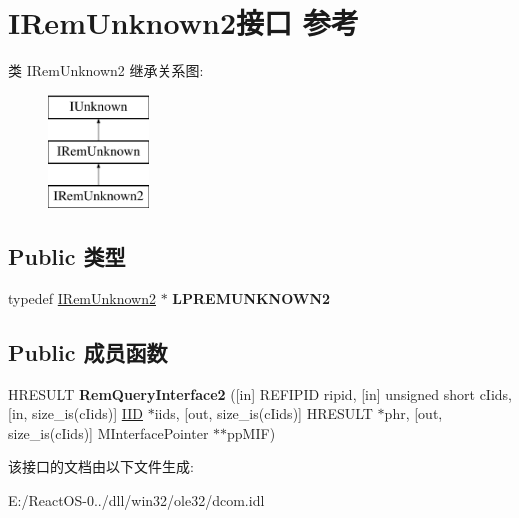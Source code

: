 \hypertarget{interface_i_rem_unknown2}{}\section{I\+Rem\+Unknown2接口 参考}
\label{interface_i_rem_unknown2}
类 I\+Rem\+Unknown2 继承关系图\+:\begin{figure}[H]
\begin{center}
\leavevmode
\includegraphics[height=3.000000cm]{interface_i_rem_unknown2}
\end{center}
\end{figure}
\subsection*{Public 类型}
\begin{DoxyCompactItemize}
\item 
\mbox{\label{interface_i_rem_unknown2_a4846e2af041b3487a0b2133e16fdc4ee}} 
typedef \hyperlink{interface_i_rem_unknown2}{I\+Rem\+Unknown2} $\ast$ {\bfseries L\+P\+R\+E\+M\+U\+N\+K\+N\+O\+W\+N2}
\end{DoxyCompactItemize}
\subsection*{Public 成员函数}
\begin{DoxyCompactItemize}
\item 
\mbox{\label{interface_i_rem_unknown2_ac1080fb722f485a9fb3fbe54d7afbfe9}} 
H\+R\+E\+S\+U\+LT {\bfseries Rem\+Query\+Interface2} (\mbox{[}in\mbox{]} R\+E\+F\+I\+P\+ID ripid, \mbox{[}in\mbox{]} unsigned short c\+Iids, \mbox{[}in, size\+\_\+is(c\+Iids)\mbox{]} \hyperlink{struct___i_i_d}{I\+ID} $\ast$iids, \mbox{[}out, size\+\_\+is(c\+Iids)\mbox{]} H\+R\+E\+S\+U\+LT $\ast$phr, \mbox{[}out, size\+\_\+is(c\+Iids)\mbox{]} M\+Interface\+Pointer $\ast$$\ast$pp\+M\+IF)
\end{DoxyCompactItemize}


该接口的文档由以下文件生成\+:\begin{DoxyCompactItemize}
\item 
E\+:/\+React\+O\+S-\/0../dll/win32/ole32/dcom.\+idl\end{DoxyCompactItemize}
